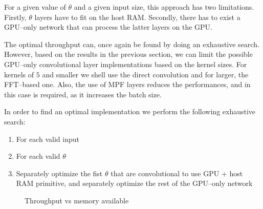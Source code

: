 \documentclass[conference]{./IEEEtran/IEEEtran}
\begin{document}
  For a given value of $\theta$ and a given input size, this approach
  has two limitations.  Firstly, $\theta$ layers have to fit on the
  host RAM.  Secondly, there has to exist a GPU--only network that can
  process the latter layers on the GPU.

  The optimal throughput can, once again be found by doing an
  exhaustive search.  However, based on the results in the previous
  section, we can limit the possible GPU--only convolutional layer
  implementations based on the kernel sizes.  For kernels of $5$ and
  smaller we shell use the direct convolution and for larger, the
  FFT--based one.  Also, the use of MPF layers reduces the
  performances, and in this case is required, as it increases the
  batch size.

  In order to find an optimal implementation we perform the following
  exhaustive search:

  \begin{enumerate}
    \item For each valid input
    \item For each valid $\theta$
    \item Separately optimize the fist $\theta$ that are convolutional
      to use GPU + host RAM primitive, and separately optimize the
      rest of the GPU--only network
  \end{enumerate}

  \begin{figure}[!htbp]
    \centering

    \caption{Throughput vs memory available
    }
    \label{fig:final_results}
  \end{figure}
\end{document}
